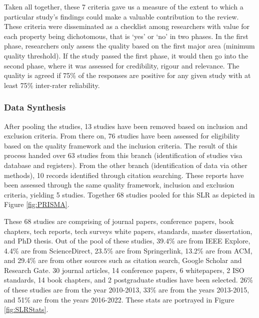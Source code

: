 \documentclass[review]{elsarticle}
\begin{document}
Taken all together, these 7 criteria gave us a measure of the extent to which a particular study's findings could make a valuable contribution to the review. These criteria were disseminated as a checklist among researchers with value for each property being dichotomous, that is `yes’ or `no’ in two
phases. In the first phase, researchers only assess the quality
based on the first major area (minimum quality threshold).
If the study passed the first phase, it would then go into the
second phase, where it was assessed for credibility, rigour
and relevance. The quality is agreed if 75\% of the responses
are positive for any given study with at least 75\% inter-rater
reliability.


\subsubsection{Data Synthesis}

After pooling the studies, 13 studies have been removed based on inclusion  and exclusion criteria. From there on, 76 studies have been assessed for eligibility based on the quality framework and the inclusion criteria. The result of this process handed over 63 studies from this branch (identification of studies visa database and registers). From the other branch (identification of data via other methods), 10 records identified through citation searching. These reports have been assessed through the same quality framework, inclusion and exclusion criteria, yielding 5 studies. Together 68 studies pooled for this SLR as depicted in Figure \ref{fig:PRISMA}.


These 68 studies are comprising of journal papers, conference papers, book chapters, tech reports, tech surveys white papers, standards, master dissertation, and PhD thesis. Out of the pool of these studies, 39.4\% are from IEEE Explore, 4.4\% are from ScienceDirect, 23.5\% are from Springerlink, 13.2\% are from ACM, and 29.4\% are from other sources such as citation search, Google Scholar and Research Gate. 30 journal articles, 14 conference papers, 6 whitepapers, 2 ISO standards, 14 book chapters, and 2 postgraduate studies have been selected. 26\% of these studies are from the year 2010-2013, 33\% are from the years 2013-2015, and 51\% are from the years 2016-2022. These stats are portrayed in Figure \ref{fig:SLRStats}.
\end{document}
